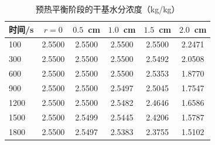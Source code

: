 \begin{table}[H]
  \centering
  \caption{预热平衡阶段的干基水分浓度（kg/kg）}
  \label{tab:table2_q1_moisture}
  \small
  \begin{tabular}{lccccc}
    \toprule
    时间/s & $r=0$ & $0.5$~cm & $1.0$~cm & $1.5$~cm & $2.0$~cm \\
    \midrule
    100 & 2.5500 & 2.5500 & 2.5500 & 2.5500 & 2.2471 \\
    300 & 2.5500 & 2.5500 & 2.5500 & 2.5492 & 2.0508 \\
    600 & 2.5500 & 2.5500 & 2.5500 & 2.5353 & 1.8770 \\
    900 & 2.5500 & 2.5500 & 2.5497 & 2.5045 & 1.7547 \\
    1200 & 2.5500 & 2.5500 & 2.5482 & 2.4646 & 1.6586 \\
    1500 & 2.5500 & 2.5499 & 2.5445 & 2.4206 & 1.5787 \\
    1800 & 2.5500 & 2.5497 & 2.5383 & 2.3755 & 1.5102 \\
    \bottomrule
  \end{tabular}
\end{table}
